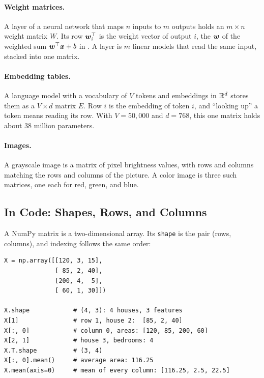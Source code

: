 \paragraph{Weight matrices.}
A layer of a neural network that maps $n$ inputs to $m$ outputs holds an
$m \times n$ weight matrix $W$. Its row $\bm{w}_i^\top$ is the weight
vector of output $i$, the $\bm{w}$ of the weighted sum
$\bm{w}^\top \bm{x} + b$ in . A layer is $m$
linear models that read the same input, stacked into one matrix.

\paragraph{Embedding tables.}
A language model with a vocabulary of $V$ tokens and embeddings in $\mathbb{R}^d$
stores them as a $V \times d$ matrix $E$. Row $i$ is the embedding of token
$i$, and ``looking up'' a token means reading its row. With $V = 50{,}000$
and $d = 768$, this one matrix holds about $38$ million parameters.

\paragraph{Images.}
A grayscale image is a matrix of pixel brightness values, with rows and
columns matching the rows and columns of the picture. A color image is
three such matrices, one each for red, green, and blue.

\subsection{In Code: Shapes, Rows, and Columns}
\label{sec:ch03-matrix-code}

A NumPy matrix is a two-dimensional array. Its \texttt{shape} is the pair
(rows, columns), and indexing follows the same order:

\begin{lstlisting}
X = np.array([[120, 3, 15],
              [ 85, 2, 40],
              [200, 4,  5],
              [ 60, 1, 30]])

X.shape            # (4, 3): 4 houses, 3 features
X[1]               # row 1, house 2:  [85, 2, 40]
X[:, 0]            # column 0, areas: [120, 85, 200, 60]
X[2, 1]            # house 3, bedrooms: 4
X.T.shape          # (3, 4)
X[:, 0].mean()     # average area: 116.25
X.mean(axis=0)     # mean of every column: [116.25, 2.5, 22.5]
\end{lstlisting}

